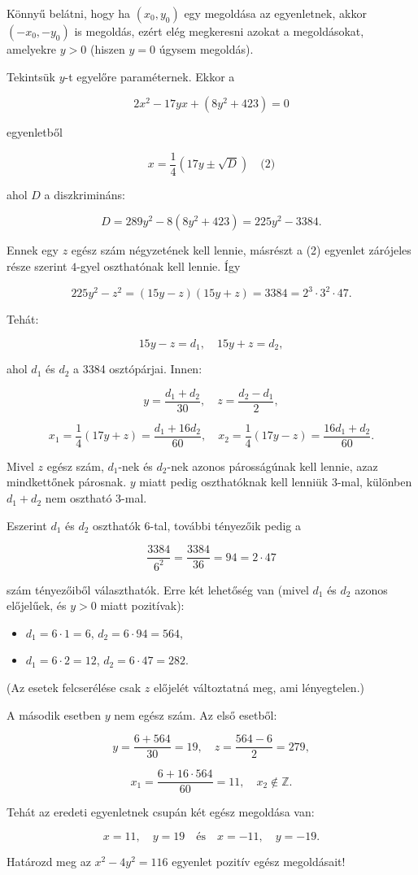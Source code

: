 \begin{solution}
	Könnyű belátni, hogy ha $(x_{0},y_{0})$ egy megoldása az egyenletnek,
	akkor $(-x_{0},-y_{0})$ is megoldás, ezért elég megkeresni azokat
	a megoldásokat, amelyekre $y>0$ (hiszen $y=0$ úgysem megoldás).
	
	Tekintsük $y$-t egyelőre paraméternek. Ekkor a
	
	\[
	2x^{2}-17yx+(8y^{2}+423)=0
	\]
	
	egyenletből
	
	\[
	x=\frac{1}{4}\left(17y\pm\sqrt{D}\right)\quad\text{(2)}
	\]
	
	ahol $D$ a diszkrimináns:
	
	\[
	D=289y^{2}-8(8y^{2}+423)=225y^{2}-3384.
	\]
	
	Ennek egy $z$ egész szám négyzetének kell lennie, másrészt a (2)
	egyenlet zárójeles része szerint $4$-gyel oszthatónak kell lennie.
	Így
	
	\[
	225y^{2}-z^{2}=(15y-z)(15y+z)=3384=2^{3}\cdot3^{2}\cdot47.
	\]
	
	Tehát:
	
	\[
	15y-z=d_{1},\quad15y+z=d_{2},
	\]
	
	ahol $d_{1}$ és $d_{2}$ a 3384 osztópárjai. Innen:
	
	\[
	y=\frac{d_{1}+d_{2}}{30},\quad z=\frac{d_{2}-d_{1}}{2},
	\]
	
	\[
	x_{1}=\frac{1}{4}(17y+z)=\frac{d_{1}+16d_{2}}{60},\quad x_{2}=\frac{1}{4}(17y-z)=\frac{16d_{1}+d_{2}}{60}.
	\]
	
	Mivel $z$ egész szám, $d_{1}$-nek és $d_{2}$-nek azonos párosságúnak
	kell lennie, azaz mindkettőnek párosnak. $y$ miatt pedig oszthatóknak
	kell lenniük 3-mal, különben $d_{1}+d_{2}$ nem osztható 3-mal.
	
	Eszerint $d_{1}$ és $d_{2}$ oszthatók 6-tal, további tényezőik pedig
	a
	
	\[
	\frac{3384}{6^{2}}=\frac{3384}{36}=94=2\cdot47
	\]
	
	szám tényezőiből választhatók. Erre két lehetőség van (mivel $d_{1}$
	és $d_{2}$ azonos előjelűek, és $y>0$ miatt pozitívak):
	\begin{itemize}
		\item $d_{1}=6\cdot1=6$, \quad{}$d_{2}=6\cdot94=564$, 
		\item $d_{1}=6\cdot2=12$, \quad{}$d_{2}=6\cdot47=282$. 
	\end{itemize}
	(Az esetek felcserélése csak $z$ előjelét változtatná meg, ami lényegtelen.)
	
	A második esetben $y$ nem egész szám. Az első esetből:
	
	\[
	y=\frac{6+564}{30}=19,\quad z=\frac{564-6}{2}=279,
	\]
	
	\[
	x_{1}=\frac{6+16\cdot564}{60}=11,\quad x_{2}\notin\mathbb{Z}.
	\]
	
	Tehát az eredeti egyenletnek csupán két egész megoldása van:
	
	\[
	x=11,\quad y=19\quad\text{és}\quad x=-11,\quad y=-19.
	\]
\end{solution}
\begin{extraproblem}
	Határozd meg az $x^{2}-4y^{2}=116$ egyenlet pozitív egész megoldásait! 
\end{extraproblem}

